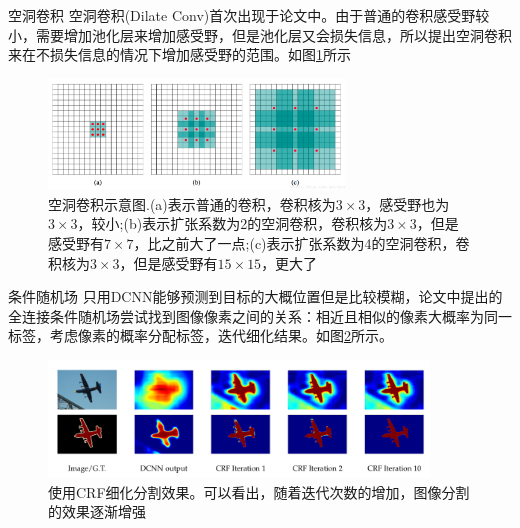 \documentclass{beamer}
\begin{document}
\begin{frame}{空洞卷积}
	空洞卷积(Dilate Conv)首次出现于论文\cite{yu2015multi}中。由于普通的卷积感受野较小，需要增加池化层来增加感受野，但是池化层又会损失信息，所以提出空洞卷积来在不损失信息的情况下增加感受野的范围。如图\ref{dilate}所示
	
	\begin{figure}[h]
		\centering
		\includegraphics[width=0.7\textwidth]{images/dilateconv.png}
		\caption{\label{dilate}空洞卷积示意图.(a)表示普通的卷积，卷积核为$3\times 3$，感受野也为$3\times 3$，较小;(b)表示扩张系数为2的空洞卷积，卷积核为$3\times 3$，但是感受野有$7\times 7$，比之前大了一点;(c)表示扩张系数为4的空洞卷积，卷积核为$3\times 3$，但是感受野有$15\times 15$，更大了}
	\end{figure}
\end{frame}



\begin{frame}{条件随机场}
只用DCNN能够预测到目标的大概位置但是比较模糊，论文\cite{krahenbuhl2011efficient}中提出的全连接条件随机场尝试找到图像像素之间的关系：相近且相似的像素大概率为同一标签，考虑像素的概率分配标签，迭代细化结果。如图\ref{crf}所示。

\begin{figure}[h]
	\centering
	\includegraphics[width=0.9\textwidth]{images/crf.png}
	\caption{\label{crf}使用CRF细化分割效果。可以看出，随着迭代次数的增加，图像分割的效果逐渐增强}
\end{figure}
\end{frame}
\end{document}
